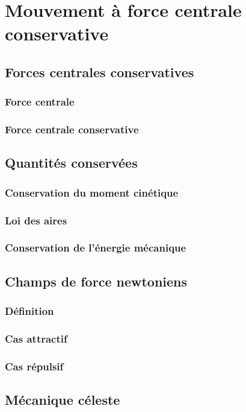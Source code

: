 \documentclass[../main/main.tex]{subfiles}
\begin{document}
\setcounter{chapter}{5}

\chapter{Mouvement à force centrale conservative}

\section{Forces centrales conservatives}
\subsection{Force centrale}
\subsection{Force centrale conservative}

\section{Quantités conservées}
\subsection{Conservation du moment cinétique}
\subsection{Loi des aires}
\subsection{Conservation de l'énergie mécanique}

\section{Champs de force newtoniens}
\subsection{Définition}
\subsection{Cas attractif}
\subsection{Cas répulsif}

\section{Mécanique céleste}
\end{document}
